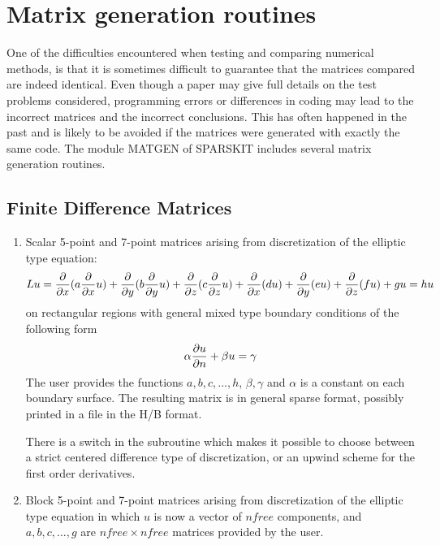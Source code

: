 
\section{Matrix generation routines}
One of the difficulties encountered when testing and comparing
numerical methods, is that it is sometimes difficult to 
guarantee that the matrices compared are indeed identical.
Even though a paper may give full details on the test
problems considered, programming errors or differences in coding
may lead to the incorrect matrices and the incorrect conclusions.
This has often happened in the past and is likely to be avoided  if 
the matrices were generated with exactly the same code. 
The module MATGEN of
SPARSKIT includes several matrix generation routines.

\subsection{Finite Difference Matrices}

\begin{enumerate}
\item Scalar 5-point and 7-point matrices arising 
from discretization of the elliptic type equation:
\begin{equation}
L u = {\partial \over \partial x} ( a   {\partial \over \partial x } u ) 
+ {\partial \over \partial y } ( b   {\partial \over \partial y }  u) 
+ {\partial \over \partial z } ( c   {\partial \over \partial z } u ) 
+ {\partial \over \partial x } ( d   u ) + {\partial \over \partial y }  (e   u) 
+ {\partial \over \partial z } ( f   u ) + g   u  = h u
\label{5-7pt}
\end{equation} 
on rectangular regions with general mixed type boundary conditions of
the following form
\[ \alpha {\partial u \over \partial n} + \beta u = \gamma \]
The user provides the functions $a, b, c, ...,h$, $\beta, \gamma$ and
$\alpha$ is a constant on each boundary surface. The resulting 
matrix is in general sparse format, possibly printed in a file
in the H/B format. 

There is a switch in the subroutine which makes it possible to choose
between a strict centered difference type of discretization, or an
upwind scheme for the first order derivatives.

\item
Block 5-point and 7-point matrices arising 
from discretization of the elliptic type equation 
in which $u$ is now a vector of $nfree$ components, and
$a,b,c, ..., g$ are $nfree \times  nfree $ matrices provided by the
user.

\end{enumerate}

